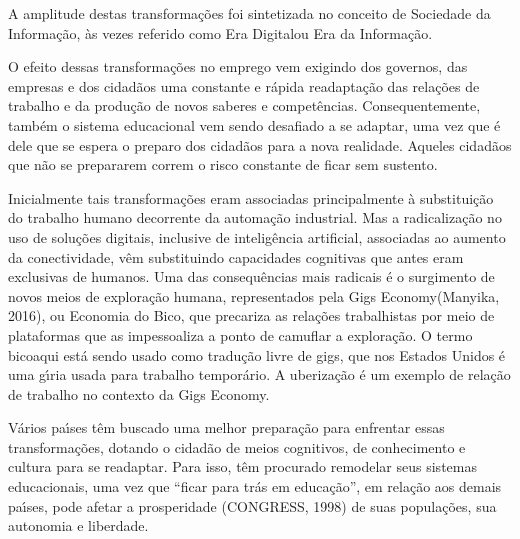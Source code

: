 \documentclass[
12pt,		%
openright,	%
twoside,  %
a4paper,			%
chapter=TITLE,		%
english,			%
french,				%
spanish,			%
brazil				%
]{USPSC-classe/USPSC}
\begin{document}
A amplitude destas transforma\c{c}\~oes foi sintetizada no conceito de \textquotedbl Sociedade da Informa\c{c}\~ao\textquotedbl , \`as vezes referido como \textquotedbl Era Digital\textquotedbl  ou \textquotedbl Era da Informa\c{c}\~ao\textquotedbl .









O efeito dessas transforma\c{c}\~oes no emprego vem exigindo dos governos, das empresas e dos cidad\~aos uma constante e r\'apida readapta\c{c}\~ao  das rela\c{c}\~oes de trabalho e da produ\c{c}\~ao de novos saberes e compet\^encias. Consequentemente, tamb\'em o sistema educacional vem sendo desafiado a se adaptar, uma vez que \'e dele que se espera o preparo dos cidad\~aos para a nova realidade. Aqueles cidad\~aos que n\~ao se prepararem correm o risco constante de ficar sem sustento.









Inicialmente tais transforma\c{c}\~oes eram associadas principalmente \`a substitui\c{c}\~ao do trabalho humano decorrente da automa\c{c}\~ao industrial. Mas a radicaliza\c{c}\~ao no uso de solu\c{c}\~oes digitais, inclusive de intelig\^encia artificial, associadas ao aumento da conectividade, v\^em substituindo capacidades \textquotedbl cognitivas que antes eram exclusivas de humanos\textquotedbl [4 XXX]. Uma das consequ\^encias mais radicais \'e o surgimento de novos meios de explora\c{c}\~ao humana, representados pela \textquotedbl Gigs Economy\textquotedbl   (Manyika, 2016), ou \textquotedbl Economia do Bico\textquotedbl , que precariza as rela\c{c}\~oes trabalhistas por meio de plataformas que as impessoaliza a ponto de camuflar a explora\c{c}\~ao. O termo \textquotedbl bico\textquotedbl  aqui est\'a sendo usado como tradu\c{c}\~ao livre de \textquotedbl gigs\textquotedbl , que nos Estados Unidos \'e uma g\'{\i}ria usada para trabalho tempor\'ario. A uberiza\c{c}\~ao \'e um exemplo de rela\c{c}\~ao de trabalho no contexto da Gigs Economy.









V\'arios pa\'{\i}ses t\^em buscado uma melhor prepara\c{c}\~ao para enfrentar essas transforma\c{c}\~oes, dotando o cidad\~ao de meios cognitivos, de conhecimento e cultura para se readaptar. Para isso, t\^em procurado remodelar seus sistemas educacionais, uma vez que “ficar para tr\'as em educa\c{c}\~ao”, em rela\c{c}\~ao aos demais pa\'{\i}ses, pode afetar a prosperidade (CONGRESS, 1998)  de suas popula\c{c}\~oes, sua autonomia e liberdade.
\end{document}
